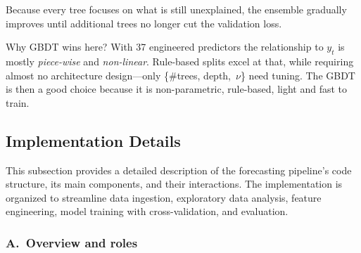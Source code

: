 Because every tree focuses on what is still unexplained, the ensemble
gradually improves until additional trees no longer cut the validation loss.


Why GBDT wins here? With 37 engineered predictors the relationship to $y_t$ is mostly
\textit{piece-wise} and \textit{non-linear}. Rule-based splits excel at that,
while requiring almost no architecture design—only \{\#trees, depth,~$\nu$\}
need tuning. The GBDT is then a good choice because it is non-parametric, rule-based, 
light and fast to train.




\subsection{Implementation Details}
\label{ssec:impl_details}

This subsection provides a detailed description of the forecasting pipeline's code structure, its main 
components, and their interactions. The implementation is organized to streamline data ingestion, 
exploratory data analysis, feature engineering, model training with cross-validation, and evaluation.

\subsubsection*{A.\ Overview and roles}

